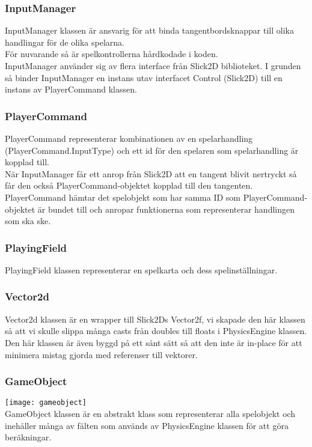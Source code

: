\subsubsection{InputManager}
InputManager klassen är ansvarig för att binda tangentbordsknappar till olika handlingar för de olika spelarna.\\
För nuvarande så är spelkontrollerna hårdkodade i koden.\\
InputManager använder sig av flera interface från Slick2D biblioteket. I grunden så binder InputManager en instans utav interfacet Control (Slick2D) till en instans av PlayerCommand klassen.\\
\subsubsection{PlayerCommand}
PlayerCommand representerar kombinationen av en spelarhandling (PlayerCommand.InputType) och ett id för den spelaren som spelarhandling är kopplad till.\\
När InputManager får ett anrop från Slick2D att en tangent blivit nertryckt så får den också PlayerCommand-objektet kopplad till den tangenten. PlayerCommand hämtar det spelobjekt som har samma ID som PlayerCommand-objektet är bundet till och anropar funktionerna som representerar handlingen som ska ske.\\
\subsubsection{PlayingField}
PlayingField klassen representerar en spelkarta och dess spelinställningar.\\
\subsubsection{Vector2d}
Vector2d klassen är en wrapper till Slick2Ds Vector2f, vi skapade den här klassen så att vi skulle slippa många casts från doubles till floats i PhysicsEngine klassen. Den här klassen är även byggd på ett sånt sätt så att den inte är in-place för att minimera mistag gjorda med referenser till vektorer.\\
\subsubsection{GameObject}
\texttt{[image: gameobject]}\\
GameObject klassen är en abstrakt klass som representerar alla spelobjekt och inehåller många av fälten som används av PhysicsEngine klassen för att göra beräkningar.\\
